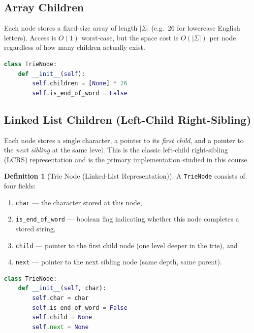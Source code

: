 \documentclass[11pt, a4paper, notitlepage]{report}
\theoremstyle{definition}
\newtheorem{definition}[theorem]{Definition}
\theoremstyle{remark}
\theoremstyle{definition}
\begin{document}
\subsection{Array Children}
\label{subsec:trie-array}

Each node stores a fixed-size array of length $|\Sigma|$ (e.g.\ 26 for
lowercase English letters).  Access is $O(1)$ worst-case, but the space cost
is $O(|\Sigma|)$ per node regardless of how many children actually exist.

\begin{lstlisting}[language=Python]
class TrieNode:
    def __init__(self):
        self.children = [None] * 26
        self.is_end_of_word = False
\end{lstlisting}

\subsection{Linked List Children (Left-Child Right-Sibling)}
\label{subsec:trie-ll}

Each node stores a single character, a pointer to its \emph{first child},
and a pointer to the \emph{next sibling} at the same level.  This is the
classic left-child right-sibling (LCRS) representation and is the primary
implementation studied in this course.

\begin{definition}[Trie Node (Linked-List Representation)]
\label{def:trie-node-ll}
A \texttt{TrieNode} consists of four fields:
\begin{enumerate}
  \item \texttt{char} --- the character stored at this node,
  \item \texttt{is\_end\_of\_word} --- boolean flag indicating whether this
        node completes a stored string,
  \item \texttt{child} --- pointer to the first child node (one level deeper
        in the trie), and
  \item \texttt{next} --- pointer to the next sibling node (same depth,
        same parent).
\end{enumerate}
\end{definition}

\begin{lstlisting}[language=Python]
class TrieNode:
    def __init__(self, char):
        self.char = char
        self.is_end_of_word = False
        self.child = None
        self.next = None
\end{lstlisting}
\end{document}
